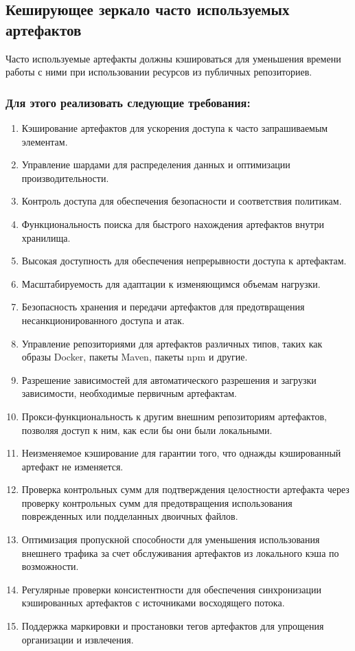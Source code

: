 \documentclass[14pt, a4paper]{extarticle}
\begin{document}
\subsection{Кеширующее зеркало часто используемых артефактов}

Часто используемые артефакты должны кэшироваться для уменьшения времени работы с ними при использовании ресурсов из публичных репозиториев.

\subsubsection*{Для этого реализовать следующие требования:}

\begin{enumerate}
\item Кэширование артефактов для ускорения доступа к часто запрашиваемым элементам.
\item Управление шардами для распределения данных и оптимизации производительности.
\item Контроль доступа для обеспечения безопасности и соответствия политикам.
\item Функциональность поиска для быстрого нахождения артефактов внутри хранилища.
\item Высокая доступность для обеспечения непрерывности доступа к артефактам.
\item Масштабируемость для адаптации к изменяющимся объемам нагрузки.
\item Безопасность хранения и передачи артефактов для предотвращения несанкционированного доступа и атак.
\item Управление репозиториями для артефактов различных типов, таких как образы Docker, пакеты Maven, пакеты npm и другие.
\item Разрешение зависимостей для автоматического разрешения и загрузки зависимости, необходимые первичным артефактам.
\item Прокси-функциональность к другим внешним репозиториям артефактов, позволяя доступ к ним, как если бы они были локальными.
\item Неизменяемое кэширование для гарантии того, что однажды кэшированный артефакт не изменяется.
\item Проверка контрольных сумм для подтверждения целостности артефакта через проверку контрольных сумм для предотвращения использования поврежденных или подделанных двоичных файлов.
\item Оптимизация пропускной способности для уменьшения использования внешнего трафика за счет обслуживания артефактов из локального кэша по возможности.
\item Регулярные проверки консистентности для обеспечения синхронизации кэшированных артефактов с источниками восходящего потока.
\item Поддержка маркировки и простановки тегов артефактов для упрощения организации и извлечения.
\end{enumerate}
\end{document}
